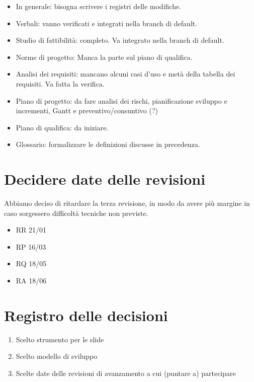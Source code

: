 \documentclass{article}
\begin{document}
\begin{itemize}
  \item In generale: bisogna scrivere i registri delle modifiche.
  \item Verbali: vanno verificati e integrati nella branch di default.
  \item Studio di fattibilità: completo. Va integrato nella branch di default.
  \item Norme di progetto: Manca la parte sul piano di qualifica.
  \item Analisi dei requisiti: mancano alcuni casi d'uso e metà della tabella dei requisiti. Va fatta la verifica.
  \item Piano di progetto: da fare analisi dei rischi, pianificazione sviluppo e incrementi, Gantt e preventivo/consuntivo (?)
  \item Piano di qualifica: da iniziare.
  \item Glossario: formalizzare le definizioni discusse in precedenza.
\end{itemize}

\section{Decidere date delle revisioni}%
\label{sec:decidere_date_delle_revisioni}

Abbiamo deciso di ritardare la terza revisione, in modo da avere più margine in caso sorgessero difficoltà tecniche non previste.

\begin{itemize}
  \item RR 21/01
  \item RP 16/03
  \item RQ 18/05
  \item RA 18/06
\end{itemize}

\newpage
\section{Registro delle decisioni}%
\label{sec:registro_delle_decisioni}

\begin{enumerate}
  \item Scelto strumento per le slide
  \item Scelto modello di sviluppo
  \item Scelte date delle revisioni di avanzamento a cui (puntare a) partecipare
\end{enumerate}

\end{document}
